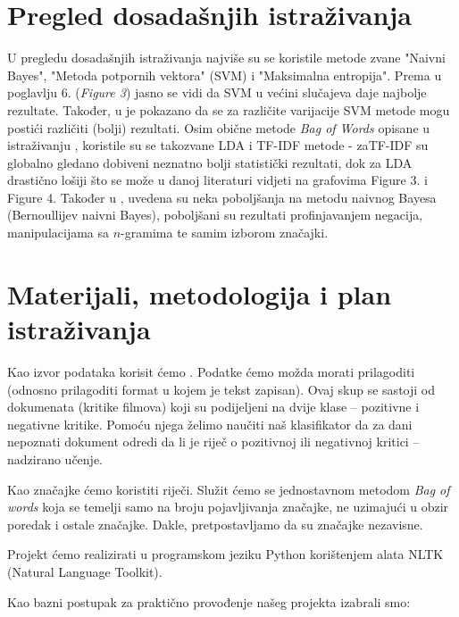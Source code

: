 \documentclass[12pt,a4paper,titlepage]{article}
\begin{document}
\section{Pregled dosadašnjih istraživanja}

U pregledu dosadašnjih istraživanja najviše su se koristile metode zvane "Naivni Bayes", "Metoda potpornih vektora" (\textsc{SVM}) i "Maksimalna entropija". Prema \cite{Pang:2002:TUS:1118693.1118704} u poglavlju 6. (\textit{Figure 3}) jasno se vidi da \textsc{SVM} u većini slučajeva daje najbolje rezultate. Također, u \cite{stan} je pokazano da se za različite varijacije \textsc{SVM} metode mogu postići različiti (bolji) rezultati. Osim obične metode \textit{Bag of Words} opisane u istraživanju \cite{maas-EtAl:2011:ACL-HLT2011}, koristile su se takozvane \textsc{LDA} i \textsc{TF-IDF} metode - za\textsc{TF-IDF} su globalno gledano dobiveni neznatno bolji statistički rezultati, dok za \textsc{LDA} drastično lošiji što se može u danoj literaturi vidjeti na grafovima Figure 3. i Figure 4. Također u \cite{SaLAD:LAS}, uvedena su neka poboljšanja na metodu naivnog Bayesa (Bernoullijev naivni Bayes), poboljšani su rezultati profinjavanjem negacija, manipulacijama sa $n$-gramima te samim izborom značajki.

\section{Materijali, metodologija i plan istraživanja}

Kao izvor podataka korisit ćemo \cite{dataset}. Podatke ćemo možda morati prilagoditi (odnosno prilagoditi format u kojem je tekst zapisan). Ovaj skup se sastoji od dokumenata (kritike filmova) koji su podijeljeni na dvije klase -- pozitivne i negativne kritike. Pomoću njega želimo naučiti naš klasifikator da za dani nepoznati dokument odredi da li je riječ o pozitivnoj ili negativnoj kritici -- nadzirano učenje.

Kao značajke ćemo koristiti riječi. Služit ćemo se jednostavnom metodom \textit{Bag of words} koja se temelji samo na broju pojavljivanja značajke, ne uzimajući u obzir poredak i ostale značajke. Dakle, pretpostavljamo da su značajke nezavisne.

Projekt ćemo realizirati u programskom jeziku Python korištenjem alata NLTK (Natural Language Toolkit). 

Kao bazni postupak za praktično provođenje našeg projekta izabrali smo:
\end{document}
